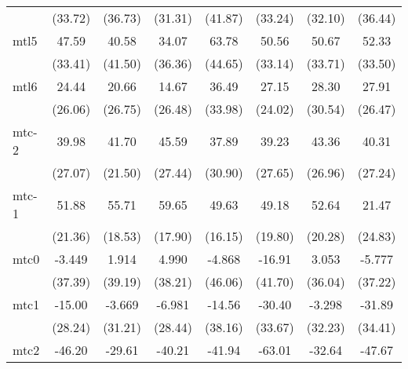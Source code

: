 \documentclass{article}
\begin{document}
{\begin{longtable}{l*{7}{c}}
                &  (33.72)         &  (36.73)         &  (31.31)         &  (41.87)         &  (33.24)         &  (32.10)         &  (36.44)         \\
mtl5            &    47.59         &    40.58         &    34.07         &    63.78         &    50.56         &    50.67         &    52.33         \\
                &  (33.41)         &  (41.50)         &  (36.36)         &  (44.65)         &  (33.14)         &  (33.71)         &  (33.50)         \\
mtl6            &    24.44         &    20.66         &    14.67         &    36.49         &    27.15         &    28.30         &    27.91         \\
                &  (26.06)         &  (26.75)         &  (26.48)         &  (33.98)         &  (24.02)         &  (30.54)         &  (26.47)         \\
mtc-2           &    39.98         &    41.70         &    45.59         &    37.89         &    39.23         &    43.36         &    40.31         \\
                &  (27.07)         &  (21.50)         &  (27.44)         &  (30.90)         &  (27.65)         &  (26.96)         &  (27.24)         \\
mtc-1           &    51.88         &    55.71\sym{*}  &    59.65\sym{*}  &    49.63\sym{*}  &    49.18         &    52.64\sym{*}  &    21.47         \\
                &  (21.36)         &  (18.53)         &  (17.90)         &  (16.15)         &  (19.80)         &  (20.28)         &  (24.83)         \\
mtc0            &   -3.449         &    1.914         &    4.990         &   -4.868         &   -16.91         &    3.053         &   -5.777         \\
                &  (37.39)         &  (39.19)         &  (38.21)         &  (46.06)         &  (41.70)         &  (36.04)         &  (37.22)         \\
mtc1            &   -15.00         &   -3.669         &   -6.981         &   -14.56         &   -30.40         &   -3.298         &   -31.89         \\
                &  (28.24)         &  (31.21)         &  (28.44)         &  (38.16)         &  (33.67)         &  (32.23)         &  (34.41)         \\
mtc2            &   -46.20         &   -29.61         &   -40.21         &   -41.94         &   -63.01         &   -32.64         &   -47.67         \\

\end{longtable}}
\end{document}
